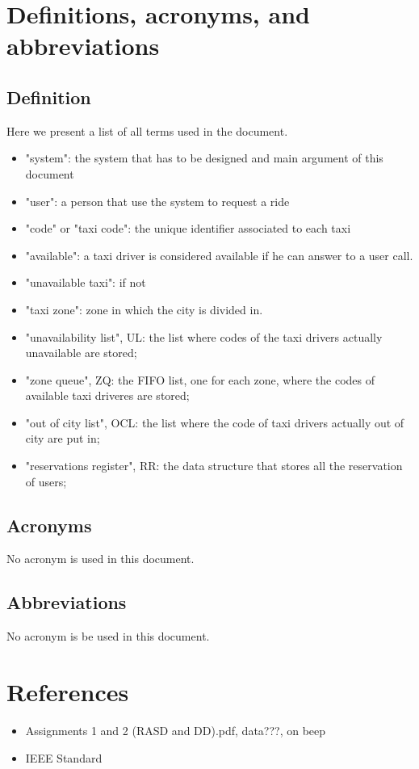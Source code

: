 \documentclass{book}
\begin{document}
\section{Definitions, acronyms, and abbreviations}
\subsection{Definition}
Here we present a list of all terms used in the document.
\begin{itemize}
\item "system": the system that has to be designed and main argument of this document
\item "user": a person that use the system to request a ride
\item "code" or "taxi code": the unique identifier associated to each taxi
\item "available": a taxi driver is considered available if he can answer to a user call.
\item "unavailable taxi": if not
\item "taxi zone": zone in which the city is divided in.
\item "unavailability list", UL: the list where codes of the taxi drivers actually unavailable are stored;
\item "zone queue", ZQ: the FIFO list, one for each zone, where the codes of available taxi driveres are stored;
\item "out of city list", OCL: the list where the code of taxi drivers actually out of city are put in;
\item "reservations register", RR: the data structure that stores all the reservation of users;
\end{itemize}

\subsection{Acronyms}
No acronym is used in this document.

\subsection{Abbreviations}
No acronym is be used in this document.

\section{References}
\begin{itemize}
\item Assignments 1 and 2 (RASD and DD).pdf, data???, on beep
\item IEEE Standard
\end{itemize}
\end{document}
